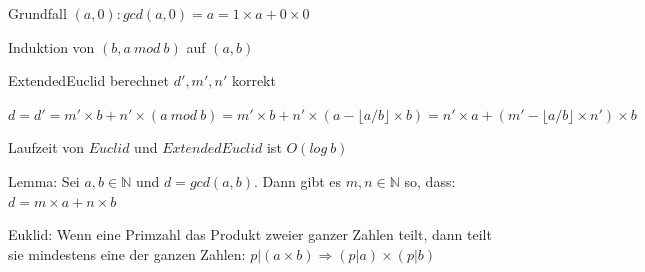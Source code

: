 \documentclass[a4paper]{article}
\begin{document}
\begin{multicols}{3}
\begin{itemize*}
            \begin{itemize*}
                  \item Grundfall $(a,0): gcd(a, 0) = a = 1 \times a + 0 \times 0$
                  \item Induktion von $(b, a\ mod\ b)$ auf $(a, b)$
                  \begin{itemize*}
                        \item ExtendedEuclid berechnet $d', m', n'$ korrekt
                        \item $d=d'=m'\times b+n'\times (a\ mod\ b)=m'\times b+n'\times (a-\lfloor a/b\rfloor\times b)=n'\times a+(m'-\lfloor a/b\rfloor\times n')\times b$
                  \end{itemize*}
                  \item Laufzeit von $Euclid$ und $ExtendedEuclid$ ist $O(log\ b)$
            \end{itemize*}
            \item Lemma: Sei $a,b\in\mathbb{N}$ und $d=gcd(a,b)$. Dann gibt es $m,n\in\mathbb{N}$ so, dass: $d=m\times a+n \times b$
            \item Euklid: Wenn eine Primzahl das Produkt zweier ganzer Zahlen teilt, dann teilt sie mindestens eine der ganzen Zahlen: $p|(a\times b)\Rightarrow (p| a)\times(p| b)$

\end{itemize*}
\end{multicols}
\end{document}
